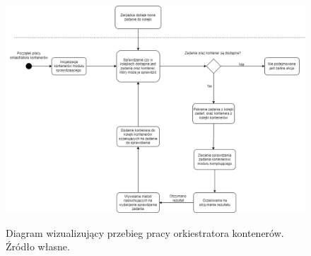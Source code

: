 \begin{figure}[!ht]
	\begin{center}
		\resizebox{1\textwidth}{!} {
			\includegraphics{img/3/orkiestrator-kontenerow-diagram-aktywnosci.png}
		}
		\caption[Diagram aktywności orkiestratora kontenerów]{Diagram wizualizujący przebieg pracy orkiestratora kontenerów. Źródło własne.}
		\label{fig:scheduler-activity-diagram}
	\end{center}
\end{figure}


